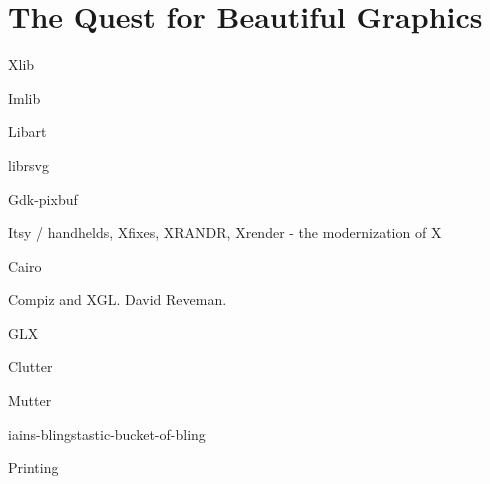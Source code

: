 \chapter{The Quest for Beautiful Graphics}

Xlib

Imlib

Libart

librsvg

Gdk-pixbuf

Itsy / handhelds, Xfixes, XRANDR, Xrender - the modernization of X

Cairo

Compiz and XGL.  David Reveman.

GLX

Clutter

Mutter

iains-blingstastic-bucket-of-bling

Printing

